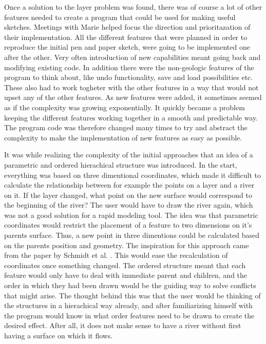 \documentclass[a4paper,12pt]{report}
\begin{document}
Once a solution to the layer problem was found, there was of course a lot of other features needed to create a program that could be used for making useful sketches. Meetings with Marie helped focus the direction and prioritazation of their implementation. All the different features that were planned in order to reproduce the initial pen and paper sketch, were going to be implemented one after the other. Very often introduction of new capabilities meant going back and modifying existing code. In addition there were the non-geologic features of the program to think about, like undo functionality, save and load possibilities etc. These also had to work togheter with the other features in a way that would not upset any of the other features. As new features were added, it sometimes seemed as if the complexity was growing exponentially. It quickly became a problem keeping the different features working together in a smooth and predictable way. The program code was therefore changed many times to try and abstract 
the complexity to make the implementation of new features as easy as possible.

It was while realizing the complexity of the initial approaches that an idea of a parametric and ordered hierachical structure was introduced. In the start, everything was based on three dimentional coordinates, which made it difficult to calculate the relationship between for example the points on a layer and a river on it. If the layer changed, what point on the new surface would correspond to the beginning of the river? The user would have to draw the river again, which was not a good solution for a rapid modeling tool. The idea was that parametric coordinates would restrict the placement of a feature to two dimensions on it's parents surface. Thus, a new point in three dimentions could be calculated based on the parents position and geometry. The inspiration for this approach came from the paper by Schmidt et al. \cite{CGF:CGF1129}. This would ease the recalculation of coordinates once something changed. The ordered structure meant that each feature would only have to deal with immediate parent and 
children, and the order in which they had been drawn would be the guiding way to solve conflicts that might arise. The thought behind this was that the user would be thinking of the structures in a hierachical way already, and after familiarizing himself with the program would know in what order features need to be drawn to create the desired effect. After all, it does not make sense to have a river without first having a surface on which it flows.
\end{document}
